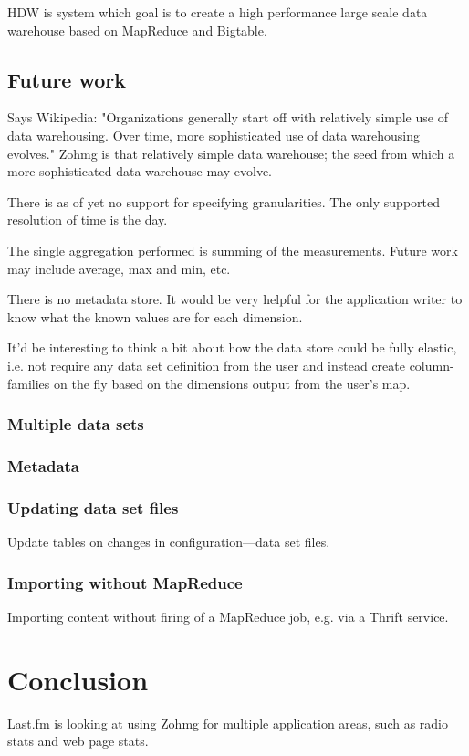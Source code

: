\documentclass[a4paper,10pt]{book}
\begin{document}
HDW is system which goal is to create a high performance large scale data
warehouse based on MapReduce and Bigtable. \cite{hdw}



\section{Future work}

Says Wikipedia: "Organizations generally start off with relatively simple use of data warehousing. Over time, more sophisticated use of data warehousing evolves." Zohmg is that relatively simple data warehouse; the seed from which a more sophisticated data warehouse may evolve.

There is as of yet no support for specifying granularities. The only supported resolution of time is the day.

The single aggregation performed is summing of the measurements. Future work may include average, max and min, etc.

There is no metadata store. It would be very helpful for the application writer to know what the known values are for each dimension.

It'd be interesting to think a bit about how the data store could be fully elastic, i.e. not require any data set definition from the user and instead create column-families on the fly based on the dimensions output from the user's map.

\subsection{Multiple data sets}

\subsection{Metadata}

\subsection{Updating data set files}

Update tables on changes in configuration---data set files.

\subsection{Importing without MapReduce}

Importing content without firing of a MapReduce job, e.g. via a Thrift
service.



\chapter{Conclusion}

Last.fm is looking at using Zohmg for multiple application areas, such as
radio stats and web page stats.


\pagebreak



 
\end{document}
